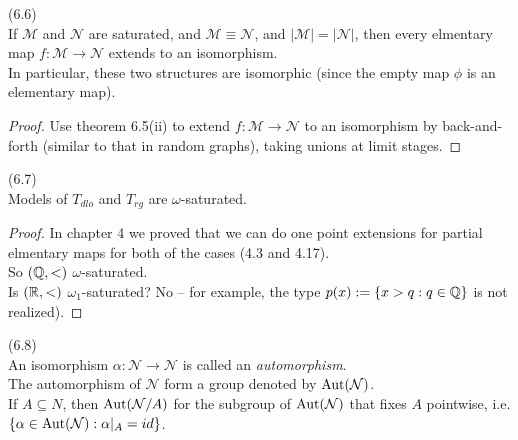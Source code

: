 \documentclass[a4paper]{article}
\begin{document}
\begin{coro} (6.6)\\
    If $\mathcal{M}$ and $\mathcal{N}$ are saturated, and $\mathcal{M} \equiv \mathcal{N}$, and $|\mathcal{M}| = |\mathcal{N}|$, then every elmentary map $f:\mathcal{M} \to \mathcal{N}$ extends to an isomorphism.\\
    In particular, these two structures are isomorphic (since the empty map $\phi$ is an elementary map).
    \begin{proof}
        Use theorem 6.5(ii) to extend $f:\mathcal{M} \to \mathcal{N}$ to an isomorphism by back-and-forth (similar to that in random graphs), taking unions at limit stages.
    \end{proof}
\end{coro}

\begin{coro} (6.7)\\
    Models of $T_{dlo}$ and $T_{rg}$ are $\omega$-saturated.
    \begin{proof}
        In chapter 4 we proved that we can do one point extensions for partial elmentary maps for both of the cases (4.3 and 4.17).\\
        So $(\mathbb{Q},<)$ $\omega$-saturated.\\
        Is $(\mathbb{R},<)$ $\omega_1$-saturated? No -- for example, the type $p(x):= \{x>q: q \in \mathbb{Q}\}$ is not realized).
    \end{proof}
\end{coro}

\begin{defi} (6.8)\\
    An isomorphism $\alpha:\mathcal{N} \to \mathcal{N}$ is called an \emph{automorphism}.\\
    The automorphism of $\mathcal{N}$ form a group denoted by $\operatorname{Aut}(\mathcal{N})$.\\
    If $A \subseteq N$, then $\operatorname{Aut}(\mathcal{N}/A)$ for the subgroup of $\operatorname{Aut}(\mathcal{N})$ that fixes $A$ pointwise, i.e. $\{\alpha \in \operatorname{Aut}(\mathcal{N}):\alpha|_A = id\}$.
\end{defi}
\end{document}
